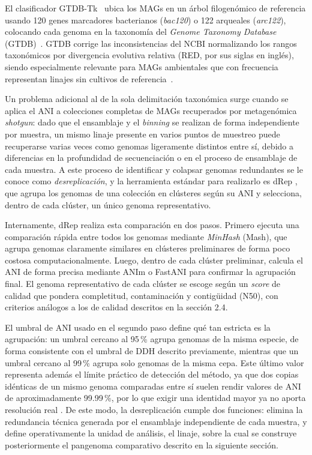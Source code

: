 El clasificador GTDB-Tk~\cite{gtdbtk2019} ubica los MAGs en un árbol
filogenómico de referencia usando 120 genes marcadores bacterianos
(\textit{bac120}) o 122 arqueales (\textit{arc122}), colocando cada
genoma en la taxonomía del \textit{Genome Taxonomy Database}
(GTDB)~\cite{gtdb2022}. GTDB corrige las inconsistencias del NCBI
normalizando los rangos taxonómicos por divergencia evolutiva relativa 
(RED, por sus siglas en inglés), siendo
especialmente relevante para MAGs ambientales que con frecuencia
representan linajes sin cultivos de referencia~\cite{gtdbtk2019,
gtdb2022}.

Un problema adicional al de la sola delimitación taxonómica surge
cuando se aplica el ANI a colecciones completas de MAGs recuperados
por metagenómica \textit{shotgun}: dado que el ensamblaje y el
\textit{binning} se realizan de forma independiente por muestra, un
mismo linaje presente en varios puntos de muestreo puede recuperarse
varias veces como genomas ligeramente distintos entre sí, debido a
diferencias en la profundidad de secuenciación o en el proceso de
ensamblaje de cada muestra. A este proceso de identificar y colapsar
genomas redundantes se le conoce como \textit{desreplicación}, y la
herramienta estándar para realizarlo es dRep \cite{olm2017}, que
agrupa los genomas de una colección en clústeres según su ANI y
selecciona, dentro de cada clúster, un único genoma representativo.

Internamente, dRep realiza esta comparación en dos pasos. Primero
ejecuta una comparación rápida entre todos los genomas mediante
\textit{MinHash} (Mash), que agrupa genomas claramente similares en
clústeres preliminares de forma poco costosa computacionalmente.
Luego, dentro de cada clúster preliminar, calcula el ANI de forma
precisa mediante ANIm o FastANI para confirmar la agrupación final.
El genoma representativo de cada clúster se escoge según un
\textit{score} de calidad que pondera completitud, contaminación y
contigüidad (N50), con criterios análogos a los de calidad descritos
en la sección 2.4.

El umbral de ANI usado en el segundo paso define qué tan estricta es
la agrupación: un umbral cercano al 95\,\% agrupa genomas de la
misma especie, de forma consistente con el umbral de DDH descrito
previamente, mientras que un umbral cercano al 99\,\% agrupa solo
genomas de la misma cepa. Este último valor representa además el
límite práctico de detección del método, ya que dos copias idénticas
de un mismo genoma comparadas entre sí suelen rendir valores de ANI
de aproximadamente 99.99\,\%, por lo que exigir una identidad mayor
ya no aporta resolución real \cite{olm2017, fastANI2018}. De este
modo, la desreplicación cumple dos funciones: elimina la redundancia
técnica generada por el ensamblaje independiente de cada muestra, y
define operativamente la unidad de análisis, el linaje, sobre la
cual se construye posteriormente el pangenoma comparativo descrito
en la siguiente sección.

